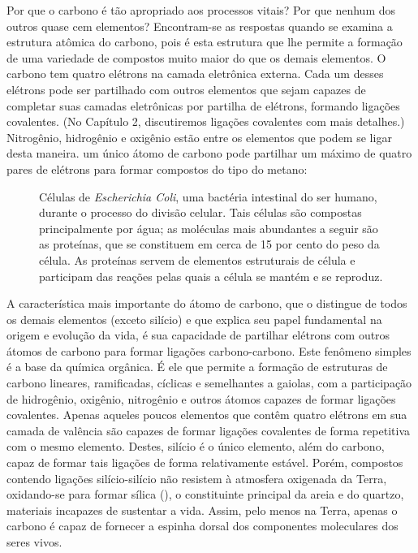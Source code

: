 Por que o carbono é tão apropriado aos processos vitais? Por que nenhum dos outros quase cem elementos? Encontram-se as respostas quando se examina a estrutura atômica do carbono, pois é esta estrutura que lhe permite a formação de uma variedade de compostos muito maior do que os demais elementos. O carbono tem quatro elétrons na camada eletrônica externa. Cada um desses elétrons pode ser partilhado com outros elementos que sejam capazes de completar suas camadas eletrônicas por partilha de elétrons, formando ligações covalentes. (No Capítulo 2, discutiremos ligações covalentes com mais detalhes.) Nitrogênio, hidrogênio e oxigênio estão entre os elementos que podem se ligar desta maneira. um único átomo de carbono pode partilhar um máximo de quatro pares de elétrons para formar compostos do tipo do metano: 

\begin{figure}[htbp]
    \centering
    \caption{Células de \textit{Escherichia Coli}, uma bactéria intestinal do ser humano, durante o processo do divisão celular. Tais células são compostas principalmente por água; as moléculas mais abundantes a seguir são as proteínas, que se constituem em cerca de 15 por cento do peso da célula. As proteínas servem de elementos estruturais de célula e participam das reações pelas quais a célula se mantém e se reproduz.}
    \label{fig1_2}
\end{figure}

\begin{tightcenter}
\end{tightcenter}

A característica mais importante do átomo de carbono, que o distingue de todos os demais elementos (exceto silício) e que explica seu papel fundamental na origem e evolução da vida, é sua capacidade de partilhar elétrons com outros átomos de carbono para formar ligações carbono-carbono. Este fenômeno simples é a base da química orgânica. É ele que permite a formação de estruturas de carbono lineares, ramificadas, cíclicas e semelhantes a gaiolas, com a participação de hidrogênio, oxigênio, nitrogênio e outros átomos capazes de formar ligações covalentes. Apenas aqueles poucos elementos que contêm quatro elétrons em sua camada de valência são capazes de formar ligações covalentes de forma repetitiva com o mesmo elemento. Destes, silício é o único elemento, além do carbono, capaz de formar tais ligações de forma relativamente estável. Porém, compostos contendo ligações silício-silício não resistem à atmosfera oxigenada da Terra, oxidando-se para formar sílica (), o constituinte principal da areia e do quartzo, materiais incapazes de sustentar a vida. Assim, pelo menos na Terra, apenas o carbono é capaz de fornecer a espinha dorsal dos componentes moleculares dos seres vivos. 

